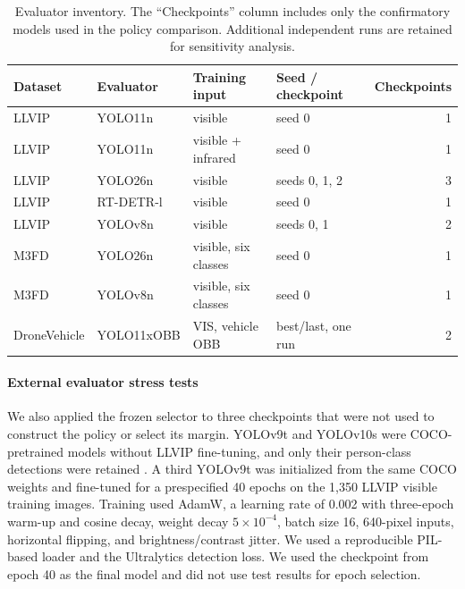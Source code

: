 \documentclass[preprint,11pt]{elsarticle}
\begin{document}
\begin{table}[t]
\centering
\small
\caption{Evaluator inventory. The ``Checkpoints'' column includes only the
confirmatory models used in the policy comparison. Additional independent runs
are retained for sensitivity analysis.}
\label{tab:evaluators}
\begin{tabular}{@{}>{\raggedright\arraybackslash}p{1.65cm}
>{\raggedright\arraybackslash}p{2.35cm}
>{\raggedright\arraybackslash}p{2.6cm}
>{\raggedright\arraybackslash}p{2.65cm}r@{}}
\toprule
Dataset & Evaluator & Training input & Seed / checkpoint & Checkpoints \\
\midrule
LLVIP & YOLO11n & visible & seed 0 & 1 \\
LLVIP & YOLO11n & visible + infrared & seed 0 & 1 \\
LLVIP & YOLO26n & visible & seeds 0, 1, 2 & 3 \\
LLVIP & RT-DETR-l & visible & seed 0 & 1 \\
LLVIP & YOLOv8n & visible & seeds 0, 1 & 2 \\
M3FD & YOLO26n & visible, six classes & seed 0 & 1 \\
M3FD & YOLOv8n & visible, six classes & seed 0 & 1 \\
Drone\-Vehicle & YOLO11x\-OBB & VIS, vehicle OBB & best/last, one run & 2 \\
\bottomrule
\end{tabular}
\end{table}

\paragraph{External evaluator stress tests}
We also applied the frozen selector to three checkpoints that were not used to
construct the policy or select its margin. YOLOv9t and YOLOv10s were
COCO-pretrained models without LLVIP fine-tuning, and only their person-class
detections were retained \cite{wang2024yolov9,wang2024yolov10}. A third
YOLOv9t was initialized from the same COCO weights and fine-tuned for a
prespecified 40 epochs on the 1,350 LLVIP visible training images. Training
used AdamW, a learning rate of 0.002 with three-epoch warm-up and cosine decay,
weight decay \(5\times10^{-4}\), batch size 16, 640-pixel inputs, horizontal
flipping, and brightness/contrast jitter. We used a reproducible PIL-based
loader and the Ultralytics detection loss. We used the checkpoint from epoch 40
as the final model and did not use test results for epoch selection.
\end{document}
